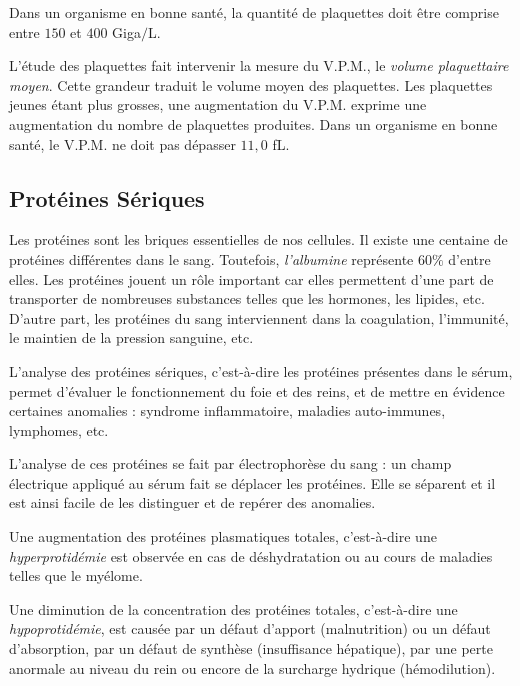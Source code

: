 \documentclass[12pt]{article}
\begin{document}
	Dans un organisme en bonne santé, la quantité de plaquettes doit être comprise entre $150$ et $400$ Giga$/$L.
	
	L'étude des plaquettes fait intervenir la mesure du V.P.M., le \textit{volume plaquettaire moyen}. Cette grandeur traduit le volume moyen des plaquettes. Les plaquettes jeunes étant plus grosses, une augmentation du V.P.M. exprime une augmentation du nombre de plaquettes produites. Dans un organisme en bonne santé, le V.P.M. ne doit pas dépasser $11,0$ fL.
	
	\subsection{Protéines Sériques}
	Les protéines sont les briques essentielles de nos cellules. Il existe une centaine de protéines différentes dans le sang. Toutefois, \textit{l'albumine} représente $60\%$ d'entre elles. Les protéines jouent un rôle important car elles permettent d'une part de transporter de nombreuses substances telles que les hormones, les lipides, etc. D'autre part, les protéines du sang interviennent dans la coagulation, l'immunité, le maintien de la pression sanguine, etc.
	
	L'analyse des protéines sériques, c'est-à-dire les protéines présentes dans le sérum, permet d'évaluer le fonctionnement du foie et des reins, et de mettre en évidence certaines anomalies : syndrome inflammatoire, maladies auto-immunes, lymphomes, etc.
	
	L'analyse de ces protéines se fait par électrophorèse du sang : un champ électrique appliqué au sérum fait se déplacer les protéines. Elle se séparent et il est ainsi facile de les distinguer et de repérer des anomalies.
	
	Une augmentation des protéines plasmatiques totales, c'est-à-dire une \textit{hyperprotidémie} est observée en cas de déshydratation ou au cours de maladies telles que le myélome.
	
	Une diminution de la concentration des protéines totales, c'est-à-dire une \textit{hypoprotidémie}, est causée par un défaut d'apport (malnutrition) ou un défaut d'absorption, par un défaut de synthèse (insuffisance hépatique), par une perte anormale au niveau du rein ou encore de la surcharge hydrique (hémodilution).
	
\end{document}
